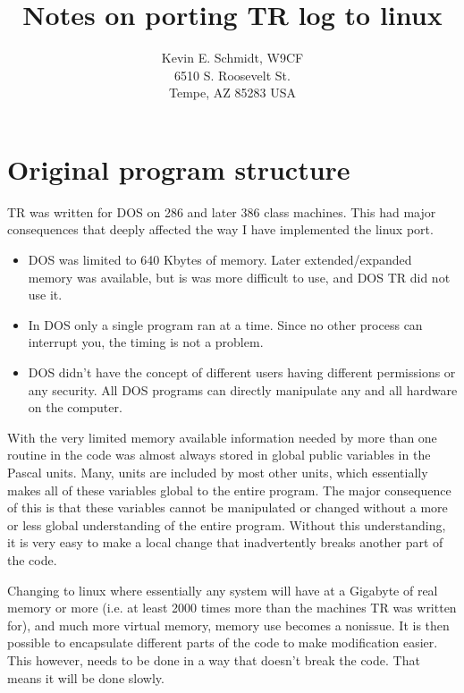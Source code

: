 \documentclass[12pt]{article}
\begin{document}
\title{Notes on porting TR log to linux}
\author{
Kevin E. Schmidt, W9CF\\
6510 S. Roosevelt St.\\
Tempe, AZ 85283 USA\\
}
\date{}
\maketitle
\section{Original program structure}
TR was written for DOS on 286 and later 386 class machines. This
had major consequences that deeply affected the way I have
implemented the linux port.
\begin{itemize}
\item
DOS was limited to 640 Kbytes of memory. Later extended/expanded
memory was available, but is was more difficult to use, and DOS TR
did not use it.
\item
In DOS only a single program ran at a time. Since no other process
can interrupt you, the timing is not a problem.
\item
DOS didn't have the concept of different users having different
permissions or any security.
All DOS programs can directly manipulate any and all hardware on the
computer.
\end{itemize}

With the very limited
memory available 
information needed by more than one routine in the code was almost
always stored in global public variables in the Pascal units. Many, units
are included by most other units, which essentially makes all of these
variables global to the entire program.  The major consequence of this
is that these variables cannot be manipulated or changed without a
more or less global understanding of the entire program. Without
this understanding, it is very
easy to make a local change that inadvertently breaks another part of the
code.

Changing to linux where essentially any system will have at
a Gigabyte of real memory or more (i.e. at least 2000 times more than the
machines TR was written for),
and much more virtual memory, memory use becomes a nonissue. It is
then possible to encapsulate different parts of the code to make modification
easier. This however, needs to be done in a way that doesn't break the
code. That means it will be done slowly.
\end{document}
